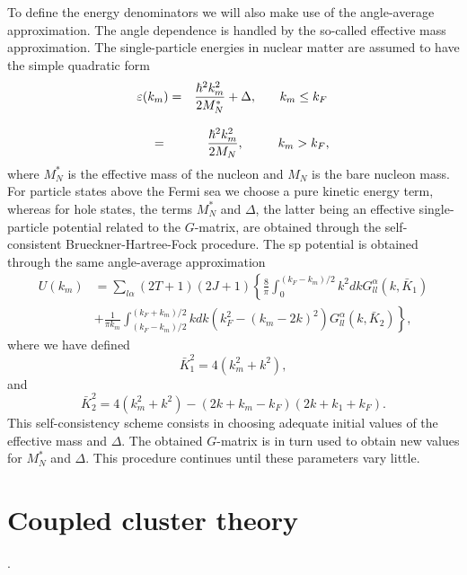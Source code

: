To define the energy denominators we will also make use of the
angle-average approximation.
The angle dependence is handled by the
so-called effective mass approximation. The single-particle energies
in nuclear matter are assumed to have the simple quadratic form
\begin{equation}
   \begin{array}{ccc}
   \varepsilon (k_m)=&
   {\displaystyle\frac{\hbar^{2}k_m^2}
   {2M_{N}^{*}}}+\Delta ,&\hspace{3mm}k_m\leq k_F\\
   &&\\
   =&{\displaystyle\frac{\hbar^{2}
   k_m^2}{2M_{N}}},&\hspace{3mm}k_m> k_F ,\\
   \end{array}
   \label{eq:spen}
\end{equation}
where $M_{N}^{*}$ is the effective mass of the nucleon and $M_{N}$ is the
bare nucleon mass. For particle states above the Fermi sea we choose
a pure kinetic energy term, whereas for hole states,
the terms $M_{N}^{*}$ and $\Delta$, the latter being 
an effective single-particle
potential related to the $G$-matrix, are obtained through the
self-consistent Brueckner-Hartree-Fock procedure.
The sp potential is obtained through the same angle-average approximation
\begin{align}
  \label{eq:Uav}
   U(k_m) & =\sum_{l\alpha} (2T+1)(2J+1)
   \left \{ \frac{8}{\pi}\int_{0}^{(k_F-k_m)/2}
   k^2dk G_{ll}^{\alpha}(k,\bar{K}_1) \right.  \\
   &    \left.
    + \frac{1}{\pi k_m}\int_{(k_F-k_m)/2}^{(k_F+k_m)/2}
   kdk (k_F ^2-(k_m-2k)^2)
   G_{ll}^{\alpha}(k,\bar{K}_2)  \right \}  \nonumber,
\end{align}
where we have defined
\begin{equation}
    \bar{K}_1^2=4(k_m^2+k^2),
\end{equation}
and
\begin{equation}
    \bar{K}_2^2=4(k_m^2+k^2)-(2k+k_m-k_F)(2k+k_1+k_F).
\end{equation}
This
self-consistency scheme consists in choosing adequate initial values of the
effective mass and $\Delta$. The obtained $G$-matrix is in turn used to
obtain new values for $M_{N}^{*}$ and $\Delta$. This procedure
continues until these parameters vary little.


\section{Coupled cluster theory}\label{sec:cctheory}.
